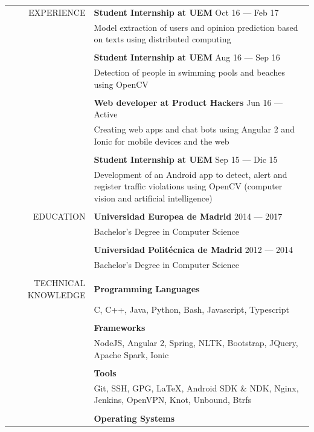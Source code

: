 \documentclass[a4paper, 11pt]{article}
\begin{document}
    \begin{longtable}{rp{11cm}}
        EXPERIENCE
        & {\bf Student Internship at UEM} \hfill Oct 16 --- Feb 17\\
        & Model extraction of users and opinion prediction based on texts using distributed computing\\\\
        & {\bf Student Internship at UEM} \hfill Aug 16 --- Sep 16\\
        & Detection of people in swimming pools and beaches using OpenCV\\\\
        & {\bf Web developer at Product Hackers} \hfill Jun 16 --- Active\\
        & Creating web apps and chat bots using Angular 2 and Ionic for mobile devices and the web\\\\
        & {\bf Student Internship at UEM} \hfill Sep 15 --- Dic 15\\
        &  Development of an Android app to detect, alert and register traffic violations using OpenCV (computer vision and artificial intelligence)\\
        \\
        EDUCATION
        & {\bf Universidad Europea de Madrid} \hfill 2014 --- 2017\\
        & Bachelor's Degree in Computer Science\\\\
        & {\bf Universidad Politécnica de Madrid} \hfill 2012 --- 2014\\
        & Bachelor's Degree in Computer Science\\\\
        TECHNICAL KNOWLEDGE
        & {\bf Programming Languages}\\
        & C, C++, Java, Python, Bash, Javascript, Typescript\\\\
        & {\bf Frameworks}\\
        & NodeJS, Angular 2, Spring, NLTK, Bootstrap, JQuery, Apache Spark, Ionic\\\\
        & {\bf Tools}\\
        & Git, SSH, GPG, \LaTeX, Android SDK \& NDK, Nginx, Jenkins, OpenVPN, Knot, Unbound, Btrfs\\\\
        & {\bf Operating Systems}\\

\end{longtable}
\end{document}
